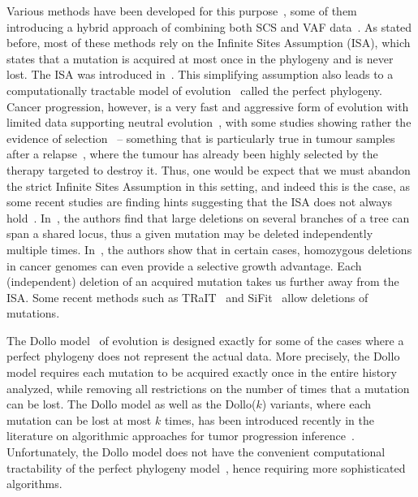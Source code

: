 \documentclass[a4paper,USenglish]{article}
\theoremstyle{definition}
\begin{document}
Various methods have been developed for this purpose~\cite{Jahn2016,Ross2016, Zafar2017},
some of them introducing a hybrid approach of combining both SCS and VAF
data~\cite{Ramazzotti132183, Malikic234914, Salehi2017}.
As stated before, most of these methods rely on the Infinite Sites Assumption (ISA), which
states that a mutation is acquired at most once in the phylogeny and is never lost. The
ISA was introduced in~\cite{Kimura1969}.
This simplifying assumption also leads to a computationally tractable model of
evolution~\cite{gusfield1991} called the perfect phylogeny.
Cancer progression, however, is a very fast and aggressive form of evolution with limited data supporting neutral evolution~\cite{DAVIS2017151}, with some studies showing rather the evidence of selection~\cite{Bignell2010,DAVIS2017151} -- something that is particularly true in tumour samples after a relapse~\cite{Ding2012,Gillies2012,DAVIS2017151}, where the tumour has already been highly selected by the therapy targeted to destroy it.
Thus, one would be expect that we must abandon the strict Infinite Sites Assumption in
this setting, and indeed this is the case, as some recent studies are finding hints
suggesting that the ISA does not always hold~\cite{Kuipers13102017,Brown2017,Bignell2010}.
In~\cite{Brown2017}, the authors find that large deletions on several branches of a tree can span a shared locus,
thus a given mutation may be deleted independently multiple times.  In~\cite{Bignell2010},
the authors show that in certain cases, homozygous deletions in cancer genomes can even
provide a selective growth advantage. Each (independent) deletion of an acquired mutation
takes us further away from the ISA. Some recent methods such as
TRaIT~\cite{Ramazzotti132183} and SiFit~\cite{Zafar2017}  allow deletions of mutations.

The Dollo model~\cite{Rogozin2006} of evolution is designed exactly
for some of the cases where a perfect phylogeny does not represent the
actual data.  More precisely, the Dollo model requires each mutation
to be acquired exactly once in the entire history analyzed, while
removing all restrictions on the number of times that a mutation can
be lost.  The Dollo model as well as the Dollo($k$) variants, where
each mutation can be lost at most $k$ times, has been introduced
recently in the literature on algorithmic approaches for tumor
progression
inference~\cite{Bonizzoni:2017:BPP:3107411.3107441,Ciccolella268243}.
Unfortunately, the Dollo model does not have the convenient
computational tractability of the perfect phylogeny
model~\cite{gusfield1991}, hence requiring more sophisticated
algorithms.
\end{document}
